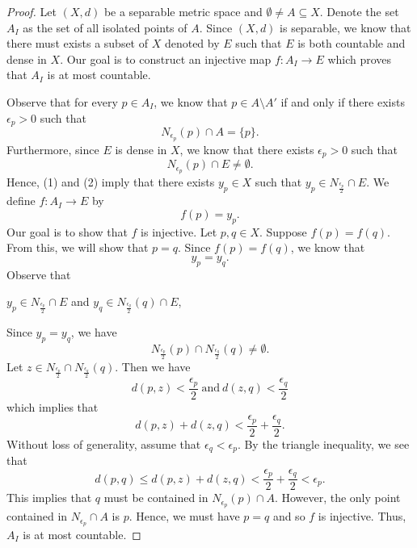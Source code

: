 \documentclass[a4paper]{article}
\begin{document}
   \begin{proof}
   Let \( (X,d) \) be a separable metric space and \( \emptyset \neq A \subseteq  X  \). Denote the set \( {A}_{I} \) as the set of all isolated points of \( A  \). Since \( (X,d) \) is separable, we know that there must exists a subset of \( X  \) denoted by \( E  \) such that \( E  \) is both countable and dense in \( X  \). Our goal is to construct an injective map \( f: {A}_{I} \to E  \) which proves that \( {A}_{I} \) is at most countable. 
   
   Observe that for every \( p \in {A}_{I} \), we know that \( p \in A \setminus  A'  \) if and only if there exists \( {\epsilon}_{p} > 0  \) such that 
   \[  {N}_{{\epsilon}_{p}}(p) \cap A = \{ p \}. \tag{1} \]
   Furthermore, since \( E  \) is dense in \( X  \), we know that there exists \( {\epsilon}_{p} > 0  \) such that  
   \[  {N}_{{\epsilon}_{p}}(p) \cap E \neq \emptyset. \tag{2} \]
   Hence, (1) and (2) imply that there exists \( {y}_{p} \in X  \) such that \( {y}_{p} \in {N}_{\frac{ {\epsilon}_{p} }{ 2 }} \cap E  \). We define \( f: {A}_{I} \to E  \) by
   \[  f(p) = {y}_{p}. \]
   Our goal is to show that \( f  \) is injective. Let \( p,q \in X  \). Suppose \( f(p) = f(q) \). From this, we will show that \( p = q  \). Since \( f(p) = f(q) \), we know that    \[  {y}_{p} = {y}_{q}. \] 
   Observe that  
   \begin{center} 
       \( {y}_{p} \in {N}_{\frac{ {\epsilon}_{p} }{ 2 } } \cap E  \) and \( {y}_{q} \in {N}_{\frac{ {\epsilon}_{q} }{ 2 } }(q) \cap E  \),
   \end{center}
   Since \( {y}_{p} = {y}_{q} \), we have 
   \[  {N}_{\frac{ {\epsilon}_{p} }{ 2 }  }(p) \cap {N}_{\frac{ {\epsilon}_{q} }{ 2 } }(q) \neq \emptyset. \]
   Let \( z \in {N}_{\frac{ {\epsilon}_{p} }{ 2 } } \cap {N}_{ \frac{ {\epsilon}_{q} }{ 2 } }(q) \). Then we have 
   \[  d(p,z) < \frac{ {\epsilon}_{p} }{ 2 }  \ \text{and} \ d(z,q) < \frac{ {\epsilon}_{q} }{ 2 } \]
   which implies that 
   \[  d(p,z) + d(z,q) < \frac{ {\epsilon}_{p} }{ 2 }  + \frac{ {\epsilon}_{q} }{ 2 }.  \]
   Without loss of generality, assume that \( {\epsilon}_{q} < {\epsilon}_{p}    \). By the triangle inequality, we see that 
   \[  d(p,q) \leq d(p,z) + d(z,q) < \frac{ {\epsilon}_{p} }{ 2 }  + \frac{ {\epsilon}_{q} }{ 2 } < {\epsilon}_{p}.  \]
 This implies that \( q  \) must be contained in \( {N}_{{\epsilon}_{p}}(p) \cap A  \). However, the only point contained in \( {N}_{{\epsilon}_{p}} \cap A  \) is \( p  \). Hence, we must have \( p = q  \) and so \( f  \) is injective. Thus, \( {A}_{I} \) is at most countable.
   \end{proof}
\end{document}

